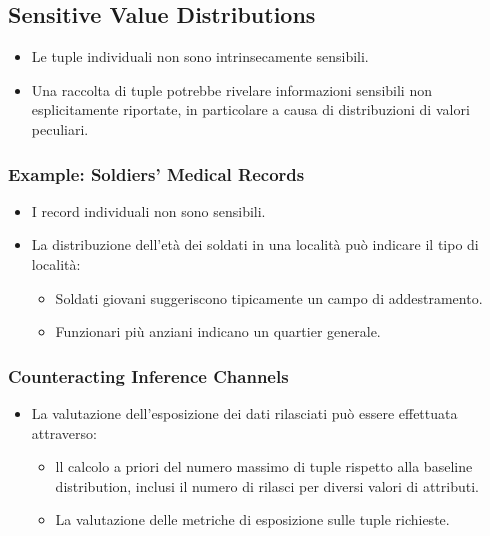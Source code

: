 \documentclass{report}
\begin{document}
\subsection{Sensitive Value Distributions}
\begin{itemize}
    \item Le tuple individuali non sono intrinsecamente sensibili.
    \item Una raccolta di tuple potrebbe rivelare informazioni sensibili non esplicitamente riportate, in particolare a causa di distribuzioni di valori peculiari.
\end{itemize}

\subsubsection{Example: Soldiers' Medical Records}
\begin{itemize}
    \item I record individuali non sono sensibili.
    \item La distribuzione dell'età dei soldati in una località può indicare il tipo di località:
    \begin{itemize}
        \item Soldati giovani suggeriscono tipicamente un campo di addestramento.
        \item Funzionari più anziani indicano un quartier generale.
    \end{itemize}
\end{itemize}

\subsubsection{Counteracting Inference Channels}
\begin{itemize}
    \item La valutazione dell'esposizione dei dati rilasciati può essere effettuata attraverso:
    \begin{itemize}
        \item ll calcolo a priori del numero massimo di tuple rispetto alla baseline distribution, inclusi il numero di rilasci per diversi valori di attributi.
        \item La valutazione delle metriche di esposizione sulle tuple richieste.
    \end{itemize}
\end{itemize}
\end{document}
